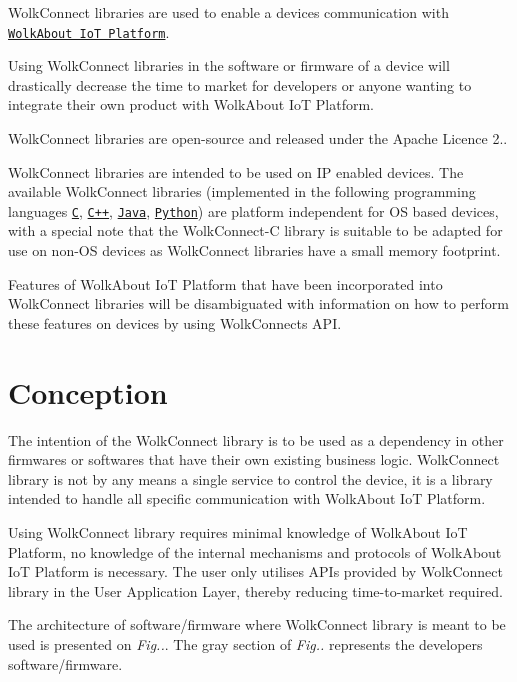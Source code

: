 Wolk\+Connect libraries are used to enable a device\textquotesingle{}s communication with \href{https://demo.wolkabout.com/#/login}{\tt Wolk\+About IoT Platform}.

Using Wolk\+Connect libraries in the software or firmware of a device will drastically decrease the time to market for developers or anyone wanting to integrate their own product with Wolk\+About IoT Platform.

Wolk\+Connect libraries are open-\/source and released under the Apache Licence 2..

Wolk\+Connect libraries are intended to be used on IP enabled devices. The available Wolk\+Connect libraries (implemented in the following programming languages \href{https://github.com/Wolkabout/WolkConnect-C}{\tt C}, \href{https://github.com/Wolkabout/WolkConnect-Cpp}{\tt C++}, \href{https://github.com/Wolkabout/WolkConnect-Java-}{\tt Java}, \href{https://github.com/Wolkabout/WolkConnect-Python}{\tt Python}) are platform independent for OS based devices, with a special note that the Wolk\+Connect-\/C library is suitable to be adapted for use on non-\/\+OS devices as Wolk\+Connect libraries have a small memory footprint.

Features of Wolk\+About IoT Platform that have been incorporated into Wolk\+Connect libraries will be disambiguated with information on how to perform these features on devices by using Wolk\+Connect\textquotesingle{}s A\+PI. 

 \section*{Conception}





The intention of the Wolk\+Connect library is to be used as a dependency in other firmwares or softwares that have their own existing business logic. Wolk\+Connect library is not by any means a single service to control the device, it is a library intended to handle all specific communication with Wolk\+About IoT Platform.

Using Wolk\+Connect library requires minimal knowledge of Wolk\+About IoT Platform, no knowledge of the internal mechanisms and protocols of Wolk\+About IoT Platform is necessary. The user only utilises A\+P\+Is provided by Wolk\+Connect library in the User Application Layer, thereby reducing time-\/to-\/market required.

The architecture of software/firmware where Wolk\+Connect library is meant to be used is presented on {\itshape Fig..}. The gray section of {\itshape Fig..} represents the developer\textquotesingle{}s software/firmware.

